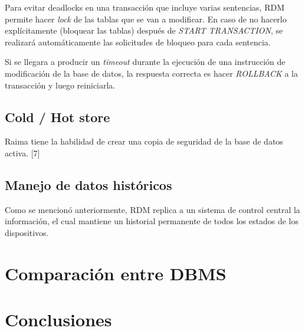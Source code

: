 \documentclass{acmart}
\begin{document}
Para evitar \textbf{}{deadlocks} en una transacción que incluye varias sentencias, RDM permite hacer \textit{lock} de las tablas que se van a modificar. En caso de no hacerlo explícitamente (bloquear las tablas) después de \textit{START TRANSACTION}, se realizará automáticamente las solicitudes de bloqueo para cada sentencia. 

Si se llegara a producir un \textit{timeout} durante la ejecución de una instrucción de modificación de la base de datos, la respuesta correcta es hacer \textit{ROLLBACK}
a la transacción y luego reiniciarla.
\subsection{Cold / Hot store}
Raima tiene la habilidad de crear una copia de seguridad de la base de datos activa. [7]
\subsection{Manejo de datos históricos}
Como se mencionó anteriormente, RDM replica a un sistema de control central la información, el cual mantiene un historial permanente de todos los estados de los dispositivos.

\newpage

\section{Comparación entre DBMS}

\section{Conclusiones}
\end{document}
